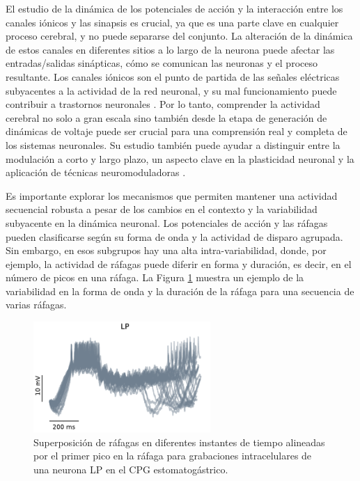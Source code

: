 El estudio de la dinámica de los potenciales de acción y la interacción entre los canales iónicos y las sinapsis es crucial, ya que es una parte clave en cualquier proceso cerebral, y no puede separarse del conjunto. La alteración de la dinámica de estos canales en diferentes sitios a lo largo de la neurona puede afectar las entradas/salidas sinápticas, cómo se comunican las neuronas y el proceso resultante. Los canales iónicos son el punto de partida de las señales eléctricas subyacentes a la actividad de la red neuronal, y su mal funcionamiento puede contribuir a trastornos neuronales \parencite{kecskes_editorial_2023}. Por lo tanto, comprender la actividad cerebral no solo a gran escala sino también desde la etapa de generación de dinámicas de voltaje puede ser crucial para una comprensión real y completa de los sistemas neuronales. Su estudio también puede ayudar a distinguir entre la modulación a corto y largo plazo, un aspecto clave en la plasticidad neuronal y la aplicación de técnicas neuromoduladoras \parencite{chambers_light-activated_2008,burke_modulation_2019}.

Es importante explorar los mecanismos que permiten mantener una actividad secuencial robusta a pesar de los cambios en el contexto y la variabilidad subyacente en la dinámica neuronal. Los potenciales de acción y las ráfagas pueden clasificarse según su forma de onda y la actividad de disparo agrupada. Sin embargo, en esos subgrupos hay una alta intra-variabilidad, donde, por ejemplo, la actividad de ráfagas puede diferir en forma y duración, es decir, en el número de picos en una ráfaga. La Figura \ref{fig:burst variability spanish} muestra un ejemplo de la variabilidad en la forma de onda y la duración de la ráfaga para una secuencia de varias ráfagas.

\begin{figure}[htb!]
	\centering
	\includegraphics[width=0.6\textwidth]{img/intro/burst_variability.pdf}
	\caption{Superposición de ráfagas en diferentes instantes de tiempo alineadas por el primer pico en la ráfaga para grabaciones intracelulares de una neurona LP en el CPG estomatogástrico.}
	\label{fig:burst variability spanish}
\end{figure}

